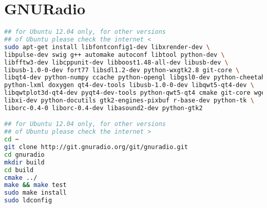 \section{GNURadio}

\begin{lstlisting}[language=bash]
## for Ubuntu 12.04 only, for other versions
## of Ubuntu please check the internet <
sudo apt-get install libfontconfig1-dev libxrender-dev \
libpulse-dev swig g++ automake autoconf libtool python-dev \
libfftw3-dev libcppunit-dev libboost1.48-all-dev libusb-dev \
libusb-1.0-0-dev fort77 libsdl1.2-dev python-wxgtk2.8 git-core \
libqt4-dev python-numpy ccache python-opengl libgsl0-dev python-cheetah \
python-lxml doxygen qt4-dev-tools libusb-1.0-0-dev libqwt5-qt4-dev \
libqwtplot3d-qt4-dev pyqt4-dev-tools python-qwt5-qt4 cmake git-core wget \
libxi-dev python-docutils gtk2-engines-pixbuf r-base-dev python-tk \
liborc-0.4-0 liborc-0.4-dev libasound2-dev python-gtk2

## for Ubuntu 12.04 only, for other versions 
## of Ubuntu please check the internet >
cd ~
git clone http://git.gnuradio.org/git/gnuradio.git
cd gnuradio
mkdir build
cd build
cmake ../
make && make test
sudo make install
sudo ldconfig

\end{lstlisting}